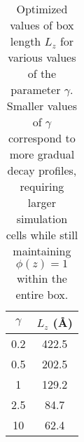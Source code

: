 \begin{table}[H]
\centering
\caption{Optimized values of box length $L_z$ for various values of the parameter $\gamma$. Smaller values of $\gamma$ correspond to more gradual decay profiles, requiring larger simulation cells while still maintaining $\phi(z) = 1$ within the entire box.}
\label{tab:Lz_values}
\begin{tabular}{|c|c|}
\hline
\rowcolor[HTML]{CBCEFB} 
$\gamma$ & $L_z$ (\AA) \\ \hline
0.2            & 422.5           \\ \hline
0.5            & 202.5           \\ \hline
1              & 129.2           \\ \hline
2.5            & 84.7            \\ \hline
10             & 62.4            \\ \hline
\end{tabular}
\end{table}
